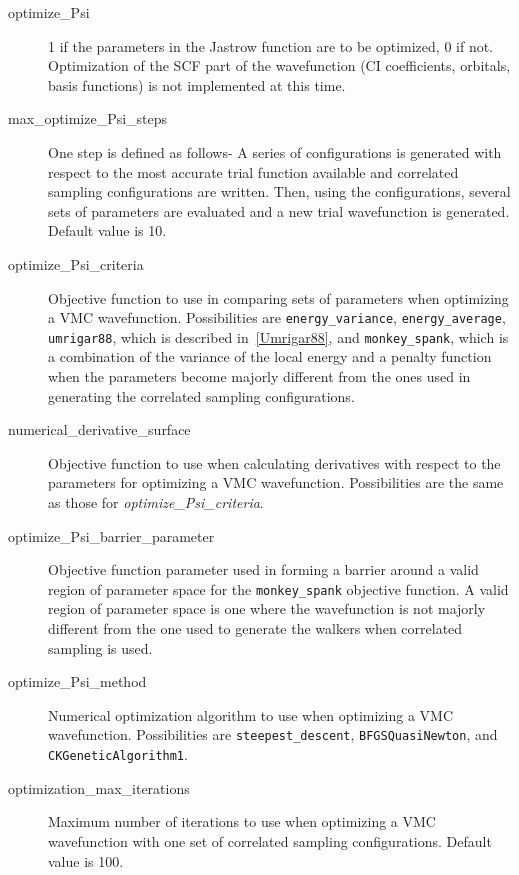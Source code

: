 \documentclass{article}
\begin{document}
\begin{description}

\item [optimize\_Psi] 1 if the parameters in the Jastrow function are to
  be optimized, 0 if not.  Optimization of the SCF part of the
  wavefunction (CI coefficients, orbitals, basis functions) is not
  implemented at this time.  

\item [max\_optimize\_Psi\_steps] One step is defined as follows- A series
  of configurations is generated with respect to the most accurate
  trial function available and correlated sampling configurations are
  written.  Then, using the configurations, several sets of parameters
  are evaluated and a new trial wavefunction is generated.  Default
  value is 10.  

\item [optimize\_Psi\_criteria] Objective function to use in
  comparing sets of parameters when optimizing a VMC wavefunction.
  Possibilities are \verb-energy_variance-, \verb-energy_average-,
  \verb-umrigar88-, which is described in~\ref{Umrigar88}, and
  \verb-monkey_spank-, which is a combination of the variance of the
  local energy and a penalty function when the parameters become
  majorly different from the ones used in generating the correlated
  sampling configurations.  

\item [numerical\_derivative\_surface] Objective function to use
  when calculating derivatives with respect to the parameters for
  optimizing a VMC wavefunction.  Possibilities are the same as those
  for \emph{optimize\_Psi\_criteria}.

\item [optimize\_Psi\_barrier\_parameter] Objective function
  parameter used in forming a barrier around a valid region of
  parameter space for the \verb-monkey_spank- objective function.  A
  valid region of parameter space is one where the wavefunction is not
  majorly different from the one used to generate the walkers when
  correlated sampling is used. 

\item [optimize\_Psi\_method] Numerical optimization algorithm to
  use when optimizing a VMC wavefunction.  Possibilities are
  \verb-steepest_descent-, \verb-BFGSQuasiNewton-, and
  \verb-CKGeneticAlgorithm1-. 

\item [optimization\_max\_iterations] Maximum number of iterations
  to use when optimizing a VMC wavefunction with one set of correlated
  sampling configurations.  Default value is 100.


\end{description}
\end{document}
